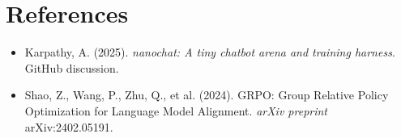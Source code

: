 \documentclass[11pt]{article}
\begin{document}
\section*{References}
\begin{itemize}
\item Karpathy, A. (2025). \textit{nanochat: A tiny chatbot arena and training harness}. GitHub discussion.
\item Shao, Z., Wang, P., Zhu, Q., et al. (2024). GRPO: Group Relative Policy Optimization for Language Model Alignment. \textit{arXiv preprint} arXiv:2402.05191.
\end{itemize}
\end{document}
